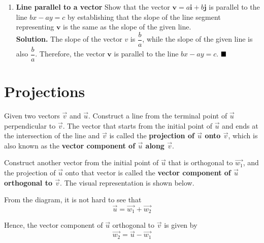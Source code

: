 \documentclass{report}
\begin{document}
\begin{enumerate}
    \item \textbf{Line parallel to a vector} Show that the vector $\mathbf{v}=a \mathbf{i}+b \mathbf{j}$ is parallel to the line $b x-a y=c$ by establishing that the slope of the line segment representing $\mathbf{v}$ is the same as the slope of the given line.
          \\\textbf{Solution. }The slope of the vector $v$ is $\dfrac{b}{a}$, while the slope of the given line is also $\dfrac{b}{a}$. Therefore, the vector $\mathbf{v}$ is parallel to the line $bx - ay = c$. $\hfill\blacksquare$
\end{enumerate}

\chapter{Projections}

Given two vectors $\vec{v}$ and $\vec{u}$. Construct a line from the terminal
point of $\vec{u}$ perpendicular to $\vec{v}$. The vector that starts from the
initial point of $\vec{u}$ and ends at the intersection of the line and
$\vec{v}$ is called the \textbf{projection of $\vec{u}$ onto $\vec{v}$}, which
is also known as the \textbf{vector component of $\vec{u}$ along $\vec{v}$}.

Construct another vector from the initial point of $\vec{u}$ that is orthogonal
to $\vec{w_1}$, and the projection of $\vec{u}$ onto that vector is called the
\textbf{vector component of $\vec{u}$ orthogonal to $\vec{v}$}. The visual
representation is shown below.
\begin{center}
\end{center}

From the diagram, it is not hard to see that \[\vec{u} = \vec{w_1} + \vec{w_2}\]

Hence, the vector component of $\vec{u}$ orthogonal to $\vec{v}$ is given by \[\vec{w_2} = \vec{u} - \vec{w_1}\]
\end{document}
